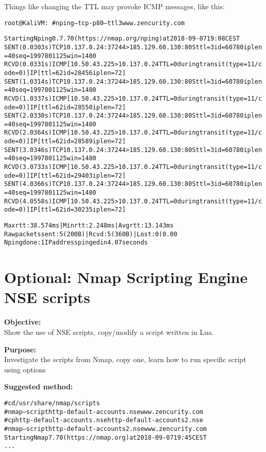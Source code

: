 \documentclass[a4paper,11pt,notitlepage]{report}
\begin{document}
Things like changing the TTL may provoke ICMP messages, like this:
\begin{alltt}\footnotesize
root@KaliVM:~# nping --tcp -p 80 --ttl 3 www.zencurity.com

Starting Nping 0.7.70 ( https://nmap.org/nping ) at 2018-09-07 19:08 CEST
SENT (0.0303s) TCP 10.137.0.24:37244 > 185.129.60.130:80 S ttl=3 id=60780 iplen=40  seq=1997801125 win=1480
RCVD (0.0331s) ICMP [10.50.43.225 > 10.137.0.24 TTL=0 during transit (type=11/code=0) ] IP [ttl=62 id=28456 iplen=72 ]
SENT (1.0314s) TCP 10.137.0.24:37244 > 185.129.60.130:80 S ttl=3 id=60780 iplen=40  seq=1997801125 win=1480
RCVD (1.0337s) ICMP [10.50.43.225 > 10.137.0.24 TTL=0 during transit (type=11/code=0) ] IP [ttl=62 id=28550 iplen=72 ]
SENT (2.0330s) TCP 10.137.0.24:37244 > 185.129.60.130:80 S ttl=3 id=60780 iplen=40  seq=1997801125 win=1480
RCVD (2.0364s) ICMP [10.50.43.225 > 10.137.0.24 TTL=0 during transit (type=11/code=0) ] IP [ttl=62 id=28589 iplen=72 ]
SENT (3.0346s) TCP 10.137.0.24:37244 > 185.129.60.130:80 S ttl=3 id=60780 iplen=40  seq=1997801125 win=1480
RCVD (3.0733s) ICMP [10.50.43.225 > 10.137.0.24 TTL=0 during transit (type=11/code=0) ] IP [ttl=62 id=29403 iplen=72 ]
SENT (4.0366s) TCP 10.137.0.24:37244 > 185.129.60.130:80 S ttl=3 id=60780 iplen=40  seq=1997801125 win=1480
RCVD (4.0558s) ICMP [10.50.43.225 > 10.137.0.24 TTL=0 during transit (type=11/code=0) ] IP [ttl=62 id=30235 iplen=72 ]

Max rtt: 38.574ms | Min rtt: 2.248ms | Avg rtt: 13.143ms
Raw packets sent: 5 (200B) | Rcvd: 5 (360B) | Lost: 0 (0.00%)
Nping done: 1 IP address pinged in 4.07 seconds
\end{alltt}



\chapter{Optional: Nmap Scripting Engine NSE scripts}
\label{ex:nmap-nse}

{\bf Objective:} \\
Show the use of NSE scripts, copy/modify a script written in Lua.

{\bf Purpose:}\\
Investigate the scripts from Nmap, copy one, learn how to run specific script using options

{\bf Suggested method:}\\
\begin{alltt}
# cd /usr/share/nmap/scripts
# nmap --script http-default-accounts.nse www.zencurity.com
# cp http-default-accounts.nse http-default-accounts2.nse
# nmap --script http-default-accounts2.nse www.zencurity.com
Starting Nmap 7.70 ( https://nmap.org ) at 2018-09-07 19:45 CEST
...
\end{alltt}
\end{document}
